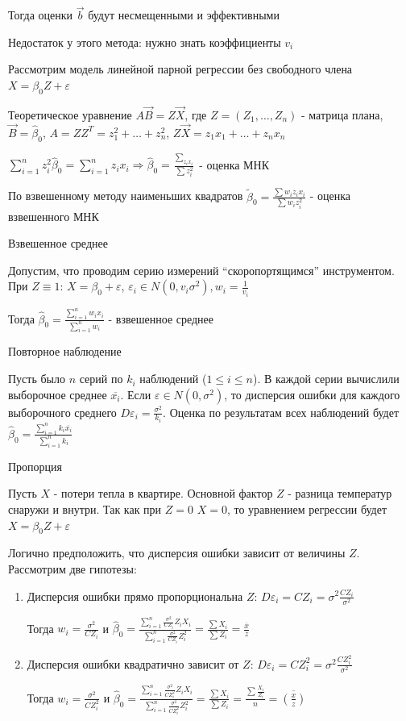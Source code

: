 \documentclass[12pt]{article}
\begin{document}
Тогда оценки $\vec b$ будут несмещенными и эффективными

Недостаток у этого метода: нужно знать коэффициенты $v_i$

\Ex Рассмотрим модель линейной парной регрессии без свободного члена $X = \beta_0 Z + \varepsilon$

Теоретическое уравнение $A \vec B = Z \vec X$, где $Z = \left(Z_1, \dots, Z_n\right)$ - матрица плана, $\vec B = \hat \beta_0$, $A = Z Z^T = z_1^2 + \dots + z_n^2$, $Z \vec X = z_1 x_1 + \dots + z_n x_n$

$\sum_{i = 1}^n z^2_i \hat \beta_0 = \sum_{i = 1}^n z_i x_i \Longrightarrow \hat \beta_0 = \frac{\sum_{z_i x_i}}{\sum z^2_i}$ - оценка МНК 

По взвешенному методу наименьших квадратов $\tilde \beta_0 = \frac{\sum w_i z_i x_i}{\sum w_i z_i^2}$ - оценка взвешенного МНК

 Взвешенное среднее

Допустим, что проводим серию измерений \enquote{скоропортящимся} инструментом. При $Z \equiv 1$: $X = \beta_0 + \varepsilon$, $\varepsilon_i \in N(0, v_i \sigma^2), w_i = \frac{1}{v_i}$

Тогда $\hat \beta_0 = \frac{\sum_{i = 1}^n w_i x_i}{\sum_{i = 1}^n w_i}$ - взвешенное среднее

 Повторное наблюдение

Пусть было $n$ серий по $k_i$ наблюдений ($1 \leq i \leq n$). В каждой серии вычислили выборочное среднее $\overline{x_i}$. 
Если $\varepsilon \in N(0, \sigma^2)$, то дисперсия ошибки для каждого выборочного среднего $D\varepsilon_i = \frac{\sigma^2}{k_i}$. Оценка по результатам всех наблюдений будет $\hat \beta_0 = \frac{\sum_{i = 1}^n k_i \overline{x_i}}{\sum_{i = 1}^n k_i}$

 Пропорция

Пусть $X$ - потери тепла в квартире. Основной фактор $Z$ - разница температур снаружи и внутри. Так как при $Z = 0$ $X = 0$, то уравнением регрессии будет $X = \beta_0 Z + \varepsilon$

Логично предположить, что дисперсия ошибки зависит от величины $Z$. Рассмотрим две гипотезы:

\begin{enumerate}
    \item Дисперсия ошибки прямо пропорциональна $Z$: $D\varepsilon_i = C Z_i = \sigma^2 \frac{C Z_i}{\sigma^2}$

    Тогда $w_i = \frac{\sigma^2}{C Z_i}$ и $\hat \beta_0 = \frac{\sum_{i = 1}^n \frac{\sigma^2}{C Z_i} Z_i X_i}{\sum_{i = 1}^n \frac{\sigma^2}{C Z_i} Z_i^2} = \frac{\sum X_i}{\sum Z_i} = \frac{\overline{x}}{\overline{z}}$

    \item Дисперсия ошибки квадратично зависит от $Z$: $D\varepsilon_i = C Z_i^2 = \sigma^2 \frac{C Z_i^2}{\sigma^2}$

    Тогда $w_i = \frac{\sigma^2}{C Z_i^2}$ и $\hat \beta_0 = \frac{\sum_{i = 1}^n \frac{\sigma^2}{C Z_i^2} Z_i X_i}{\sum_{i = 1}^n \frac{\sigma^2}{C Z_i^2} Z_i^2} = \frac{\sum X_i}{\sum Z_i} = \frac{\sum \frac{X_i}{Z_i}}{n} = \overline{\left(\frac{x}{z}\right)}$
\end{enumerate}
\end{document}
